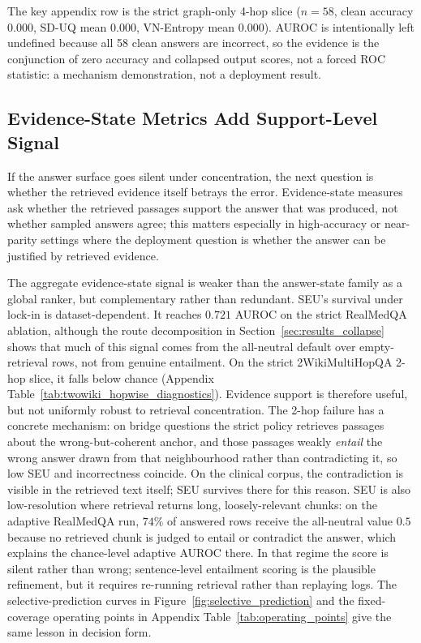 The key appendix row is the strict graph-only 4-hop slice
($n=58$, clean accuracy $0.000$, SD-UQ mean $0.000$, VN-Entropy mean $0.000$).
AUROC is intentionally left undefined because all 58 clean answers are
incorrect, so the evidence is the conjunction of zero accuracy and collapsed
output scores, not a forced ROC statistic: a mechanism demonstration, not a
deployment result.

\subsection{Evidence-State Metrics Add Support-Level Signal}
\label{sec:results_grounding}

If the answer surface goes silent under concentration, the next
question is whether the retrieved evidence itself betrays the error.
Evidence-state measures ask whether the retrieved passages support the answer
that was produced, not whether sampled answers agree; this matters especially
in high-accuracy or near-parity settings where the deployment question is
whether the answer can be justified by retrieved evidence.

The aggregate evidence-state signal is weaker than the answer-state family as
a global ranker, but complementary rather than redundant.
SEU's survival under lock-in is dataset-dependent. It reaches $0.721$
AUROC on the strict RealMedQA ablation, although the route decomposition in
Section~\ref{sec:results_collapse} shows that much of this signal comes from
the all-neutral default over empty-retrieval rows, not from genuine entailment.
On the strict 2WikiMultiHopQA 2-hop slice, it falls below chance
(Appendix Table~\ref{tab:twowiki_hopwise_diagnostics}). Evidence support is
therefore useful, but not uniformly robust to retrieval concentration.
The 2-hop failure has a concrete mechanism: on bridge questions the strict
policy retrieves passages about the wrong-but-coherent anchor, and those
passages weakly \emph{entail} the wrong answer drawn from that neighbourhood
rather than contradicting it, so low SEU and incorrectness coincide.
On the clinical corpus, the contradiction is visible in the retrieved text
itself; SEU survives there for this reason.
SEU is also low-resolution where retrieval returns long, loosely-relevant
chunks: on the adaptive RealMedQA run, $74\%$ of answered rows receive the
all-neutral value $0.5$ because no retrieved chunk is judged to entail or
contradict the answer, which explains the chance-level adaptive AUROC there.
In that regime the score is silent rather than wrong; sentence-level
entailment scoring is the plausible refinement, but it requires re-running
retrieval rather than replaying logs.
The selective-prediction curves in Figure~\ref{fig:selective_prediction}
and the fixed-coverage operating points in Appendix
Table~\ref{tab:operating_points} give the same lesson in decision form.

